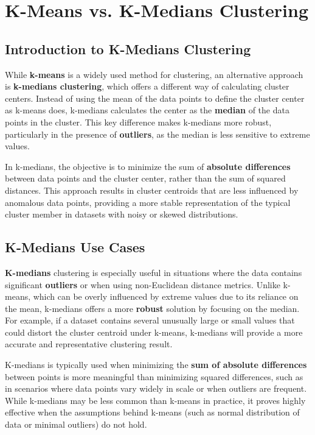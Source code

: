 \section{K-Means vs. K-Medians Clustering}
\subsection{Introduction to K-Medians Clustering}
\begin{flushleft}
    \large While \textbf{k-means} is a widely used method for clustering, an alternative approach is \textbf{k-medians clustering}, which offers a different way of calculating cluster centers. Instead of using the mean of the data points to define the cluster center as k-means does, k-medians calculates the center as the \textbf{median} of the data points in the cluster. This key difference makes k-medians more robust, particularly in the presence of \textbf{outliers}, as the median is less sensitive to extreme values.
    
    In k-medians, the objective is to minimize the sum of \textbf{absolute differences} between data points and the cluster center, rather than the sum of squared distances. This approach results in cluster centroids that are less influenced by anomalous data points, providing a more stable representation of the typical cluster member in datasets with noisy or skewed distributions.
\end{flushleft}

\subsection{K-Medians Use Cases}
\begin{flushleft}
    \large \textbf{K-medians} clustering is especially useful in situations where the data contains significant \textbf{outliers} or when using non-Euclidean distance metrics. Unlike k-means, which can be overly influenced by extreme values due to its reliance on the mean, k-medians offers a more \textbf{robust} solution by focusing on the median. For example, if a dataset contains several unusually large or small values that could distort the cluster centroid under k-means, k-medians will provide a more accurate and representative clustering result.

    K-medians is typically used when minimizing the \textbf{sum of absolute differences} between points is more meaningful than minimizing squared differences, such as in scenarios where data points vary widely in scale or when outliers are frequent. While k-medians may be less common than k-means in practice, it proves highly effective when the assumptions behind k-means (such as normal distribution of data or minimal outliers) do not hold.
\end{flushleft}


